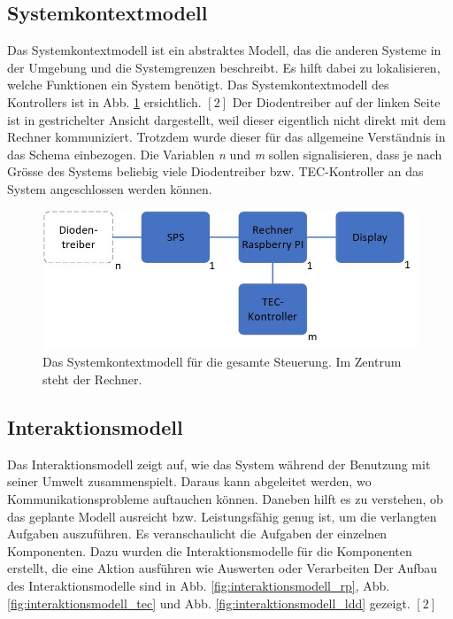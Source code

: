 \subsection{Systemkontextmodell}
Das Systemkontextmodell ist ein abstraktes Modell, das die anderen Systeme in der Umgebung und die Systemgrenzen beschreibt. Es hilft dabei zu lokalisieren, welche Funktionen ein System benötigt. Das Systemkontextmodell des Kontrollers ist in Abb. \ref{fig:systemkontextmodell} ersichtlich. $[2]$ Der Diodentreiber auf der linken Seite ist in gestrichelter Ansicht dargestellt, weil dieser eigentlich nicht direkt mit dem Rechner kommuniziert. Trotzdem wurde dieser für das allgemeine Verständnis in das Schema einbezogen. Die Variablen \textit{n} und \textit{m} sollen signalisieren, dass je nach Grösse des Systems beliebig viele Diodentreiber bzw. TEC-Kontroller an das System angeschlossen werden können.


\begin{figure}[H]
    \centering
    \includegraphics[scale=0.6]{98_images/systemkontext_modell_raspberry_pi.jpg}
    \caption{Das Systemkontextmodell für die gesamte Steuerung. Im Zentrum steht der Rechner.}
    \label{fig:systemkontextmodell}
\end{figure}

\subsection{Interaktionsmodell}
Das Interaktionsmodell zeigt auf, wie das System während der Benutzung mit seiner Umwelt zusammenspielt. Daraus kann abgeleitet werden, wo Kommunikationsprobleme auftauchen können. Daneben hilft es zu verstehen, ob das geplante Modell ausreicht bzw. Leistungsfähig genug ist, um die verlangten Aufgaben auszuführen. Es veranschaulicht die Aufgaben der einzelnen Komponenten. Dazu wurden die Interaktionsmodelle für die Komponenten erstellt, die eine Aktion ausführen wie Auswerten oder Verarbeiten  Der Aufbau des Interaktionsmodelle sind in Abb. \ref{fig:interaktionsmodell_rp}, Abb. \ref{fig:interaktionsmodell_tec} und Abb. \ref{fig:interaktionsmodell_ldd} gezeigt. $[2]$

